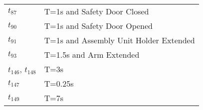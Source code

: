 \begin{longtable}{M{5cm}M{10cm}}
\hyperlink{completeNet:tt87}{\hypertarget{completeTable:tt87}{$t_{87}$}} & T=1s and Safety Door Closed\\
\hyperlink{completeNet:tt90}{\hypertarget{completeTable:tt90}{$t_{90}$}} & T=1s and Safety Door Opened\\
\hyperlink{completeNet:tt91}{\hypertarget{completeTable:tt91}{$t_{91}$}} & T=1s and Assembly Unit Holder Extended\\
\hyperlink{completeNet:tt93}{\hypertarget{completeTable:tt93}{$t_{93}$}} & T=1.5s and Arm Extended\\
\hyperlink{completeNet:tt146}{\hypertarget{completeTable:tt146}{$t_{146}$}}, \hyperlink{completeNet:tt148}{\hypertarget{completeTable:tt148}{$t_{148}$}} & T=3s\\
\hyperlink{completeNet:tt147}{\hypertarget{completeTable:tt147}{$t_{147}$}} & T=0.25s\\
\hyperlink{completeNet:tt149}{\hypertarget{completeTable:tt149}{$t_{149}$}} & T=7s\\
\end{longtable}
